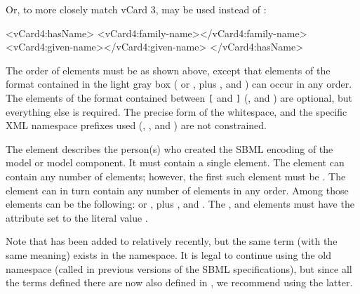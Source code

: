 Or, to more closely match vCard 3,  may be used instead of :

\vspace*{1ex}
\begin{example}
\colorbox[gray]{.94}{\begin{minipage}{5.1in}\begin{example}
\otherContent
<vCard4:hasName>
  <vCard4:family-name>\familyNameNS</vCard4:family-name>
  <vCard4:given-name>\givenNameNS</vCard4:given-name>
</vCard4:hasName>
\otherContent
\end{example}\end{minipage}}
\end{example}
\vspace*{1ex}


The order of elements must be as shown above, except that elements
of the format contained in the light gray box ( or , plus , and ) can occur in any
order.  The elements of the format contained between \texttt{[}
and \texttt{]} (, and ) are optional, but everything else is required.  The precise form of the whitespace,
and the specific XML namespace prefixes used (, , and ) are not constrained.

The  element describes the person(s) who created
the SBML encoding of the model or model component.  It must
contain a single  element.  The 
element can contain any number of elements; however, the first
such element must be .  The  element
can in turn contain any number of elements in any order.  Among
those elements can be the following:   or , plus , and .
The , and  elements
must have the attribute  set to the literal
value .

Note that  has been added to  relatively recently, but the same term (with the same meaning) exists in the  namespace.  It is legal to continue using the old namespace (called  in previous versions of the SBML specifications), but since all the terms defined there are now also defined in , we recommend using the latter.

